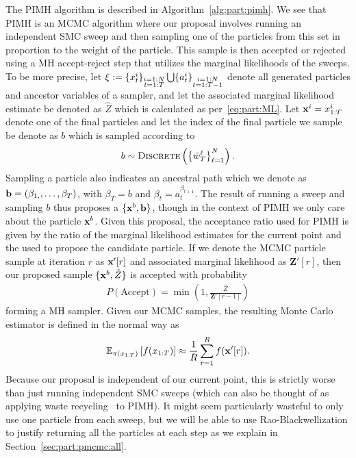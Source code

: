 The PIMH algorithm is described in Algorithm~\ref{alg:part:pimh}.  We see that PIMH is an MCMC
algorithm where our proposal involves running an independent SMC
sweep and then sampling one of the particles from this set in proportion to
the weight of the particle.
  This sample is then accepted or rejected using a MH accept-reject
step that  utilizes the marginal likelihoods of the sweeps.  
To be more precise, let $\mathbf{\xi} := \{x_{t}^i\}_{\substack{i=1:N\\t=1:T}} \bigcup \{a_{t}^i\}_{\substack{i=1:N\\t=1:T-1}}$
denote all generated particles and ancestor variables of a \smc sampler, and let the associated
marginal likelihood estimate be denoted as $\hat{Z}$ which is calculated as per~\eqref{eq:part:ML}.
Let $\mathbf{x}^i = x_{1:T}^i$ denote one of the final particles and let the index of the final
particle we sample be denote as $b$ which is sampled according to
\begin{align}
\label{eq:part:b}
b \sim \operatorname*{\textsc{Discrete}}\left(\left\{\bar w_{T}^\ell\right\}_{\ell=1}^N\right).
\end{align}
Sampling a particle also indicates an ancestral path
which we denote as $\mathbf{b} = (\beta_{1,},\ldots,\beta_{T})$, with
$\beta_{T} = b$ and $\beta_{t} = a_{t}^{\beta_{t+1}}$.  The result of running a \smc sweep
and sampling $b$ thus proposes a $\{\mathbf{x}^{b},\mathbf{b}\}$, though in the context of PIMH we only care about the particle
$\mathbf{x}^b$.  Given this proposal, the acceptance ratio used for PIMH is
given by the ratio of the marginal likelihood estimates for the current point and the \smc used
to propose the candidate particle.  If we denote the MCMC particle sample at iteration $r$ as $\mathbf{x}'[r]$ and
associated marginal likelihood as $\mathbf{Z}'[r]$, then our proposed sample $\{\mathbf{x}^b,\hat{Z}\}$ 
is accepted with probability
\begin{align}
\label{eq:part:pimh-acc}
P(\text{Accept}) = \min \left(1,\frac{\hat{Z}}{\mathbf{Z}'[r-1]}\right)
\end{align}
forming a MH sampler.
Given our MCMC samples, the resulting Monte Carlo estimator is defined in the normal way as
\begin{align}
\label{eq:part:pimh-est}
\mathbb{E}_{\pi (x_{1:T})} \left[f(x_{1:T})\right] \approx \frac{1}{R} \sum_{r=1}^{R} f(\mathbf{x}'[r]).
\end{align}
Because our proposal
is independent of our current point, this is strictly worse than just running independent SMC sweeps
(which can also be thought of as applying waste recycling~\citep{frenkel2006waste} to PIMH).  
It might seem particularly wasteful to only use
one particle from each sweep, but we will be able to use Rao-Blackwellization to justify
returning all the particles at each step as we explain in Section~\ref{sec:part:pmcmc:all}. 

